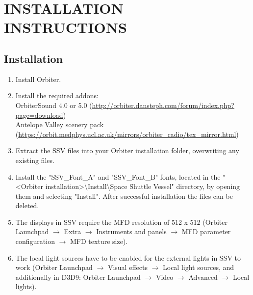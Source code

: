 \documentclass[Space_Shuttle_Vessel_Manual.tex]{subfiles}
\begin{document}
\section{INSTALLATION INSTRUCTIONS}
\begin{multicols*}{2}

\subsection{Installation}
\noindent
\begin{enumerate}
\item Install Orbiter.

\item Install the required addons:\\
OrbiterSound 4.0 or 5.0 (\url{http://orbiter.dansteph.com/forum/index.php?page=download})\\
Antelope Valley scenery pack (\url{https://orbit.medphys.ucl.ac.uk/mirrors/orbiter_radio/tex_mirror.html})

\item Extract the SSV files into your Orbiter installation folder, overwriting any existing files.\\

\item Install the "SSV\_Font\_A" and "SSV\_Font\_B" fonts, located in the "<Orbiter installation>\textbackslash Install\textbackslash Space Shuttle Vessel" directory, by opening them and selecting "Install". After successful installation the files can be deleted.

\item The displays in SSV require the MFD resolution of 512 x 512 (Orbiter Launchpad $\rightarrow$ Extra $\rightarrow$ Instruments and panels $\rightarrow$ MFD parameter configuration $\rightarrow$ MFD texture size).

\item The local light sources have to be enabled for the external lights in SSV to work (Orbiter Launchpad $\rightarrow$ Visual effects $\rightarrow$ Local light sources, and additionally in D3D9: Orbiter Launchpad $\rightarrow$ Video $\rightarrow$ Advanced $\rightarrow$ Local lights). 
\end{enumerate}



\end{multicols*}
\end{document}
